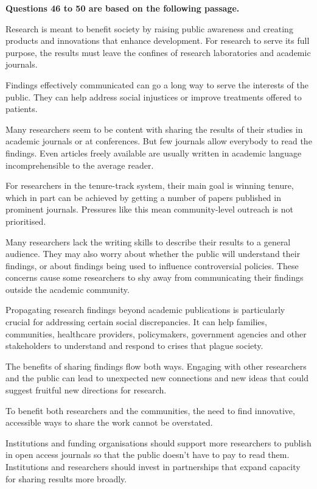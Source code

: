 \documentclass[UTF8,11pt]{ctexart}
\begin{document}
\textbf{Questions 46 to 50 are based on the following passage.}


Research is meant to benefit society by raising public awareness and creating products and innovations that enhance development. For research to serve its full purpose, the results must leave the confines of research laboratories and academic journals.


Findings effectively communicated can go a long way to serve the interests of the public. They can help address social injustices or improve treatments offered to patients.


Many researchers seem to be content with sharing the results of their studies in academic journals or at conferences. But few journals allow everybody to read the findings. Even articles freely available are usually written in academic language incomprehensible to the average reader.


For researchers in the tenure-track system, their main goal is winning tenure, which in part can be achieved by getting a number of papers published in prominent journals. Pressures like this mean community-level outreach is not prioritised.


Many researchers lack the writing skills to describe their results to a general audience. They may also worry about whether the public will understand their findings, or about findings being used to influence controversial policies. These concerns cause some researchers to shy away from communicating their findings outside the academic community.


Propagating research findings beyond academic publications is particularly crucial for addressing certain social discrepancies. It can help families, communities, healthcare providers, policymakers, government agencies and other stakeholders to understand and respond to crises that plague society.


The benefits of sharing findings flow both ways. Engaging with other researchers and the public can lead to unexpected new connections and new ideas that could suggest fruitful new directions for research.


To benefit both researchers and the communities, the need to find innovative, accessible ways to share the work cannot be overstated.


Institutions and funding organisations should support more researchers to publish in open access journals so that the public doesn’t have to pay to read them. Institutions and researchers should invest in partnerships that expand capacity for sharing results more broadly.
\end{document}
